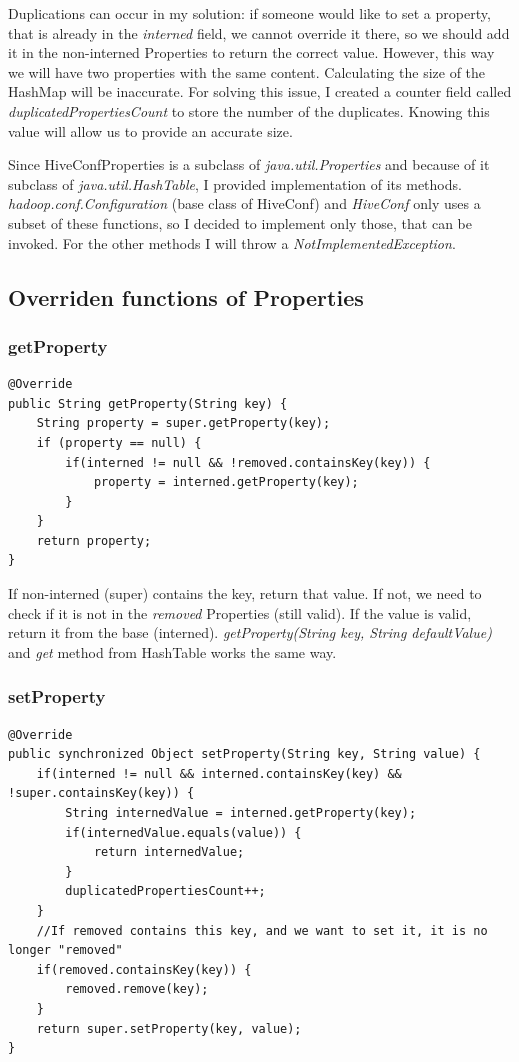 Duplications can occur in my solution: if someone would like to set a property, that is already in the \textit{interned} field, we cannot override it there, so we should add it in the non-interned Properties to return the correct value. However, this way we will have two properties with the same content. Calculating the size of the HashMap will be inaccurate. For solving this issue, I created a counter field called \textit{duplicatedPropertiesCount} to store the number of the duplicates. Knowing this value will allow us to provide an accurate size. 

Since HiveConfProperties is a subclass of \textit{java.util.Properties} and because of it subclass of \textit{java.util.HashTable}, I provided implementation of its methods.  \textit{hadoop.conf.Configuration} (base class of HiveConf) and \textit{HiveConf} only uses a subset of these functions, so I decided to implement only those, that can be invoked. For the other methods I will throw a \textit{NotImplementedException}. 

\subsection{Overriden functions of Properties}
\subsubsection{getProperty}
\begin{lstlisting}
@Override
public String getProperty(String key) {
	String property = super.getProperty(key);
	if (property == null) {
		if(interned != null && !removed.containsKey(key)) {
			property = interned.getProperty(key);
		}
	}
	return property;
}
\end{lstlisting}

If non-interned (super) contains the key, return that value. If not, we need to check if it is not in the \textit{removed} Properties (still valid). If the value is valid, return it from the base (interned). \textit{getProperty(String key, String defaultValue)} and \textit{get} method from HashTable works the same way. 
\subsubsection{setProperty}
\begin{lstlisting}
@Override
public synchronized Object setProperty(String key, String value) {
	if(interned != null && interned.containsKey(key) && !super.containsKey(key)) {
		String internedValue = interned.getProperty(key);
		if(internedValue.equals(value)) {
			return internedValue;
		}
		duplicatedPropertiesCount++;
	}
	//If removed contains this key, and we want to set it, it is no longer "removed"
	if(removed.containsKey(key)) {
		removed.remove(key);
	}
	return super.setProperty(key, value);
}
\end{lstlisting}

